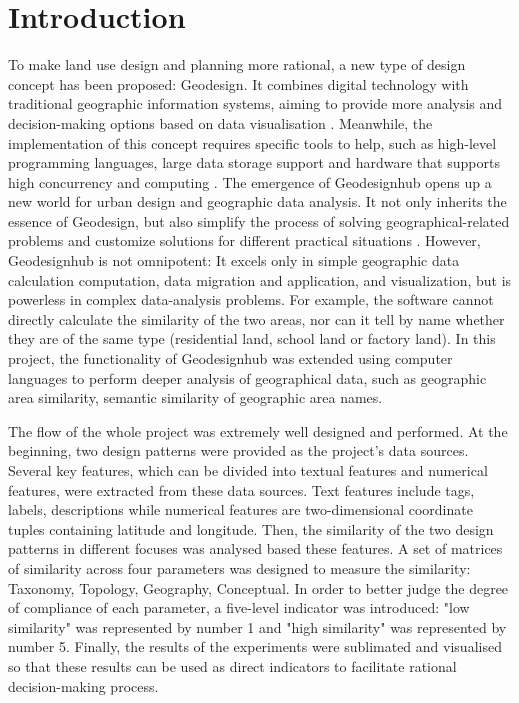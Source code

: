 

\setlength{\baselineskip}{20pt}%
\setlength{\parskip}{5pt}


\section*{Introduction}
To make land use design and planning more rational, a new type of design concept has been proposed: Geodesign. It combines digital technology with traditional geographic information systems, aiming to provide more analysis and decision-making options based on data visualisation \cite{bib1}. Meanwhile, the implementation of this concept requires specific tools to help, such as high-level programming languages, large data storage support and hardware that supports high concurrency and computing \cite{bib2}. The emergence of Geodesignhub opens up a new world for urban design and geographic data analysis. It not only inherits the essence of Geodesign, but also simplify the process of solving geographical-related problems and customize solutions for different practical situations \cite{bib3}. However, Geodesignhub is not omnipotent: It excels only in simple geographic data calculation computation, data migration and application, and visualization, but is powerless in complex data-analysis problems. For example, the software cannot directly calculate the similarity of the two areas, nor can it tell by name whether they are of the same type (residential land, school land or factory land). In this project, the functionality of Geodesignhub was extended using computer languages to perform deeper analysis of geographical data, such as geographic area similarity, semantic similarity of geographic area names. 

\marginLeft{}
The flow of the whole project was extremely well designed and performed. At the beginning, two design patterns were provided as the project's data sources. Several key features, which can be divided into textual features and numerical features, were extracted from these data sources. Text features include tags, labels, descriptions while numerical features are two-dimensional coordinate tuples containing latitude and longitude. Then, the similarity of the two design patterns in different focuses was analysed based these features. A set of matrices of similarity across four parameters was designed to measure the similarity: Taxonomy, Topology, Geography, Conceptual. In order to better judge the degree of compliance of each parameter, a five-level indicator was introduced: 
"low similarity" was represented by number 1 and "high similarity" was represented by number 5.  Finally, the results of the experiments were sublimated and visualised so that these results can be used as direct indicators to facilitate rational decision-making process.

